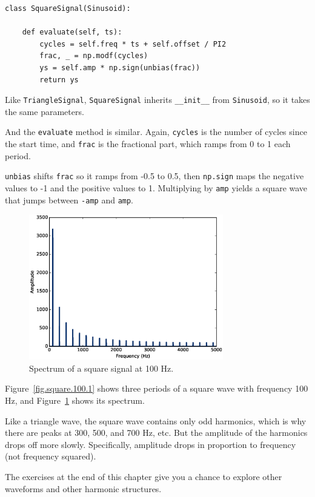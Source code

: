 \documentclass[12pt]{book}
\begin{document}
\begin{verbatim}
class SquareSignal(Sinusoid):
    
    def evaluate(self, ts):
        cycles = self.freq * ts + self.offset / PI2
        frac, _ = np.modf(cycles)
        ys = self.amp * np.sign(unbias(frac))
        return ys
\end{verbatim}

Like {\tt TriangleSignal}, {\tt SquareSignal} inherits 
\verb"__init__" from {\tt Sinusoid}, so it takes the same
parameters.

And the {\tt evaluate} method is similar.  Again, {\tt cycles} is
the number of cycles since the start time, and {\tt frac} is the
fractional part, which ramps from 0 to 1 each period.

{\tt unbias} shifts {\tt frac} so it ramps from -0.5 to 0.5,
then {\tt np.sign} maps the negative values to -1 and the
positive values to 1.  Multiplying by {\tt amp} yields a square
wave that jumps between {\tt -amp} and {\tt amp}.

\begin{figure}
\centerline{\includegraphics[height=2.5in]{figs/square-100-2.eps}}
\caption{Spectrum of a square signal at 100 Hz.}
\label{fig.square.100.2}
\end{figure}

Figure~\ref{fig.square.100.1} shows three periods of a square
wave with frequency 100 Hz,
and Figure~\ref{fig.square.100.2} shows its spectrum.

Like a triangle wave, the square wave contains only odd harmonics,
which is why there are peaks at 300, 500, and 700 Hz, etc.
But the amplitude of the harmonics drops off more slowly.
Specifically, amplitude drops in proportion to frequency (not frequency
squared).

The exercises at the end of this chapter give you a chance to
explore other waveforms and other harmonic structures.
\end{document}
